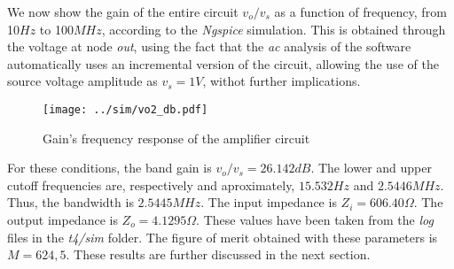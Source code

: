 \par We now show the gain of the entire circuit $v_o / v_s$ as a function of frequency, from 10$Hz$ to 100$MHz$, according to the \textit{Ngspice} simulation. This is obtained through the voltage at node \textit{out}, using the fact that the \textit{ac} analysis of the software automatically uses an incremental version of the circuit, allowing the use of the source voltage amplitude as $v_s = 1V$, withot further implications.

\vspace{-2cm}
\begin{figure}[H]
\centering
  \texttt{[image: ../sim/vo2\_db.pdf]}
  \caption{Gain's frequency response of the amplifier circuit}
  \label{fig:gain_stage_gain(freq)}
\end{figure}

\par For these conditions, the band gain is $v_o/v_s = 26.142 dB$. The lower and upper cutoff frequencies are, respectively and aproximately, $15.532 Hz$ and $2.5446 MHz$. Thus, the bandwidth is $2.5445 MHz$. The input impedance is $Z_i=606.40\Omega$. The output impedance is $Z_o=4.1295 \Omega$. These values have been taken from the \textit{log} files in the \textit{t4/sim} folder. The figure of merit obtained with these parameters is $M=624,5$. These results are further discussed in the next section.
